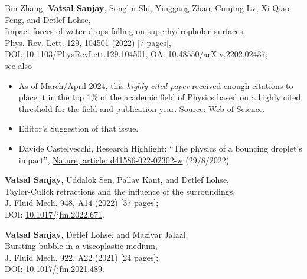 \documentclass[10pt,a4paper,colorlinks,linkcolor=blue,urlcolor=blue,citecolor=blue]{moderncv}
\begin{document}
\begin{enumerate}[leftmargin=1.5em,label=\textbf{[\arabic*]}]
	\item Bin Zhang, \textbf{Vatsal Sanjay}, Songlin Shi,  Yinggang Zhao,  Cunjing Lv,  Xi-Qiao Feng,  and Detlef Lohse,\\
	Impact forces of water drops falling on superhydrophobic surfaces,\\
	Phys. Rev. Lett. 129, 104501 (2022) [7 pages],\\
	\faLock\hspace{0.2em}DOI: \href{https://doi.org/10.1103/PhysRevLett.129.104501}{10.1103/PhysRevLett.129.104501}, \faFile\hspace{0.2em}OA:  \href{https://doi.org/10.48550/arXiv.2202.02437}{10.48550/arXiv.2202.02437};\\
	see also
	\begin{itemize}
		\item
		\faChartLine\hspace{0.2em}As of March/April 2024, this \textit{highly cited paper} received enough citations to place it in the top 1\% of the academic field of Physics based on a highly cited threshold for the field and publication year. Source: Web of Science.
		\item
		\faStar\hspace{0.2em}Editor's Suggestion of that issue.
		\item
		Davide Castelvecchi, Research Highlight: ``The physics of a bouncing droplet's impact'', \href{https://www.nature.com/articles/d41586-022-02302-w}{Nature, article: d41586-022-02302-w} (29/8/2022)
	\end{itemize}

	\item \textbf{Vatsal Sanjay}, Uddalok Sen, Pallav Kant, and Detlef Lohse,\\
	Taylor-Culick retractions and the influence of the surroundings,\\
	J. Fluid Mech. 948, A14  (2022) [37 pages];\\
	\faFile\hspace{0.2em}DOI: \href{https://doi.org/10.1017/jfm.2022.671}{10.1017/jfm.2022.671}.

	\item \textbf{Vatsal Sanjay}, Detlef Lohse, and Maziyar Jalaal,\\
	Bursting bubble in a viscoplastic medium,\\
	J. Fluid Mech. 922, A22  (2021) [24 pages];\\
	\faFile\hspace{0.2em}DOI: \href{https://doi.org/10.1017/jfm.2021.489}{10.1017/jfm.2021.489}.


\end{enumerate}
\end{document}
